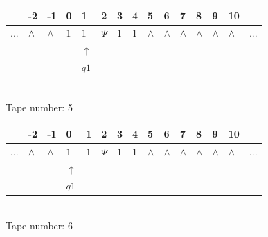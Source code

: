 \documentclass[11pt]{article}
\begin{document}
\begin{table}[H]
\centering
\begin{tabular}{lllllllllllllll}
 & -2 & -1 & 0 & 1 & 2 & 3 & 4 & 5 & 6 & 7 & 8 & 9 & 10 & \\
\hline
$...$ & \multicolumn{1}{|l|}{$\wedge$} & \multicolumn{1}{|l|}{$\wedge$} & \multicolumn{1}{|l|}{$1$} & \multicolumn{1}{|l|}{$1$} & \multicolumn{1}{|l|}{$\Psi$} & \multicolumn{1}{|l|}{$1$} & \multicolumn{1}{|l|}{$1$} & \multicolumn{1}{|l|}{$\wedge$} & \multicolumn{1}{|l|}{$\wedge$} & \multicolumn{1}{|l|}{$\wedge$} & \multicolumn{1}{|l|}{$\wedge$} & \multicolumn{1}{|l|}{$\wedge$} & \multicolumn{1}{|l|}{$\wedge$} & $...$\\
\hline
&  &  &  & $\uparrow$ &  &  &  &  &  &  &  &  &  &  \\
&  &  &  & $ q1 $ &  &  &  &  &  &  &  &  &  &  \\
\end{tabular}
\\
Tape number: 5
\noindent\makebox[\linewidth]{\hdashrule{\textwidth}{1pt}{1pt}}\end{table}
\clearpage

\begin{table}[H]
\centering
\begin{tabular}{lllllllllllllll}
 & -2 & -1 & 0 & 1 & 2 & 3 & 4 & 5 & 6 & 7 & 8 & 9 & 10 & \\
\hline
$...$ & \multicolumn{1}{|l|}{$\wedge$} & \multicolumn{1}{|l|}{$\wedge$} & \multicolumn{1}{|l|}{$1$} & \multicolumn{1}{|l|}{$1$} & \multicolumn{1}{|l|}{$\Psi$} & \multicolumn{1}{|l|}{$1$} & \multicolumn{1}{|l|}{$1$} & \multicolumn{1}{|l|}{$\wedge$} & \multicolumn{1}{|l|}{$\wedge$} & \multicolumn{1}{|l|}{$\wedge$} & \multicolumn{1}{|l|}{$\wedge$} & \multicolumn{1}{|l|}{$\wedge$} & \multicolumn{1}{|l|}{$\wedge$} & $...$\\
\hline
&  &  & $\uparrow$ &  &  &  &  &  &  &  &  &  &  &  \\
&  &  & $ q1 $ &  &  &  &  &  &  &  &  &  &  &  \\
\end{tabular}
\\
Tape number: 6
\noindent\makebox[\linewidth]{\hdashrule{\textwidth}{1pt}{1pt}}\end{table}
\end{document}
